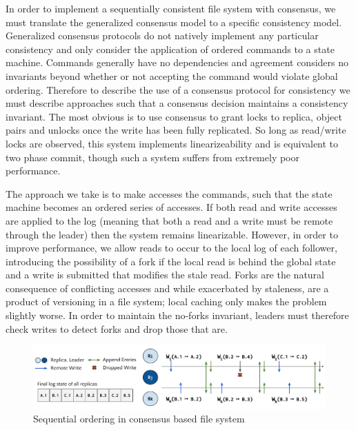 \documentclass{article}
\begin{document}
In order to implement a sequentially consistent file system with consensus, we must translate the generalized consensus model to a specific consistency model. Generalized consensus protocols do not natively implement any particular consistency and only consider the application of ordered commands to a state machine. Commands generally have no dependencies and agreement considers no invariants beyond whether or not accepting the command would violate global ordering. Therefore to describe the use of a consensus protocol for consistency we must describe approaches such that a consensus decision maintains a consistency invariant. The most obvious is to use consensus to grant locks to replica, object pairs and unlocks once the write has been fully replicated. So long as read/write locks are observed, this system implements linearizeability and is equivalent to two phase commit, though such a system suffers from extremely poor performance.

The approach we take is to make accesses the commands, such that the state machine becomes an ordered series of accesses. If both read and write accesses are applied to the log (meaning that both a read and a write must be remote through the leader) then the system remains linearizable. However, in order to improve performance, we allow reads to occur to the local log of each follower, introducing the possibility of a fork if the local read is behind the global state and a write is submitted that modifies the stale read. Forks are the natural consequence of conflicting accesses and while exacerbated by staleness, are a product of versioning in a file system; local caching only makes the problem slightly worse. In order to maintain the no-forks invariant, leaders must therefore check writes to detect forks and drop those that are.

\begin{figure}
    \centering
        \includegraphics[width=.9\textwidth]{figures/ordered}
        \caption{Sequential ordering in consensus based file system}
        \label{fig:ordered}
\end{figure}
\end{document}
